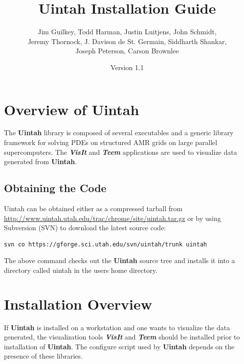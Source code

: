\documentclass[12pt]{article}
\begin{document}
\title{Uintah Installation Guide}

\author{Jim Guilkey, Todd Harman, Justin Luitjens, John Schmidt,
  \\ Jeremy Thornock,
  J. Davison de St. Germain, Siddharth Shankar, \\
  Joseph Peterson,  
  Carson Brownlee}

\date{Version 1.1}

\maketitle



\newpage

\tableofcontents

\newpage

\section{Overview of Uintah} \label{sec:overview}

The \textbf{Uintah} library is composed of several executables and a
generic library framework for solving PDEs on structured AMR grids on
large parallel supercomputers. The \textbf{\emph{VisIt}} and
\textbf{\emph{Teem}} applications are used to visualize data generated
from \textbf{Uintah}.

\subsection{Obtaining the Code}
Uintah can be obtained either as a compressed tarball from
\url{http://www.uintah.utah.edu/trac/chrome/site/uintah.tar.gz} or by using
Subversion (SVN) to download the latest source code:

\begin{verbatim}
svn co https://gforge.sci.utah.edu/svn/uintah/trunk uintah
\end{verbatim}

The above command checks out the \textbf{Uintah} source tree and
installs it into a directory called uintah in the users home
directory.


\section{Installation Overview}

If \textbf{Uintah} is installed on a workstation and one wants to
visualize the data generated, the visualization tools
\textbf{\emph{VisIt}} and \textbf{\emph{Teem}} should be installed
prior to installation of \textbf{Uintah}.  The configure script used by
\textbf{Uintah} depends on the presence of these libraries.
\end{document}
